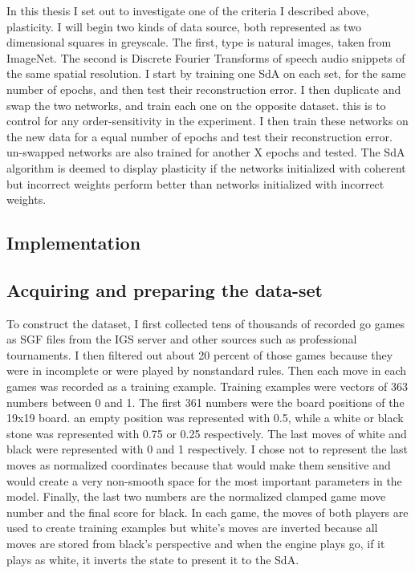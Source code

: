 \documentclass[12pt]{article}
\begin{document}
	In this thesis I set out to investigate one of the criteria I described above, plasticity. I will begin two kinds of data source, both represented as two dimensional squares in greyscale. The first, type is natural images, taken from ImageNet. The second is Discrete Fourier Transforms of speech audio snippets of the same spatial resolution. I start by training one SdA on each set, for the same number of epochs, and then test their reconstruction error. I then duplicate and swap the two networks, and train each one on the opposite dataset. this is to control for any order-sensitivity in the experiment. I then train these networks on the new data for a equal number of epochs and test their reconstruction error. un-swapped networks are also trained for another X epochs and tested. The SdA algorithm is deemed to display plasticity if the networks initialized with coherent but incorrect weights perform better than networks initialized with incorrect weights.
	
	\subsection{Implementation}
	
		
	\subsection{Acquiring and preparing the data-set}
	
To construct the dataset, I first collected tens of thousands of recorded go games as SGF files from the IGS server and other sources such as professional tournaments. I then filtered out about 20 percent of those games because they were in incomplete or were played by nonstandard rules. Then each move in each games was recorded as a training example. Training examples were vectors of 363 numbers between 0 and 1. The first 361 numbers were the board positions of the 19x19 board. an empty position was represented with 0.5, while a white or black stone was represented with 0.75 or 0.25 respectively. The last moves of white and black were represented with 0 and 1 respectively. I chose not to represent the last moves as normalized coordinates because that would make them sensitive and would create a very non-smooth space for the most important parameters in the model. Finally, the last two numbers are the normalized clamped game move number and the final score for black. In each game, the moves of both players are used to create training examples but white's moves are inverted because all moves are stored from black's perspective and when the engine plays go, if it plays as white, it inverts the state to present it to the SdA.
\end{document}
